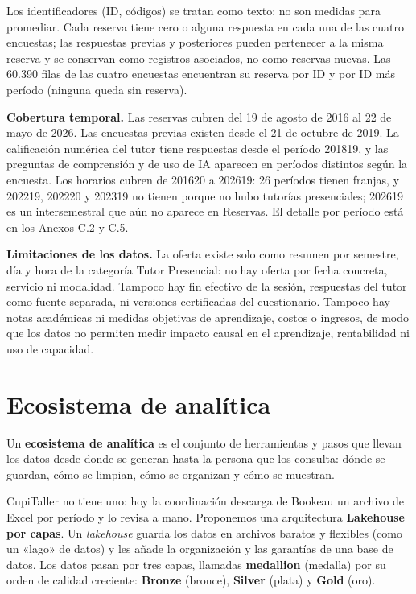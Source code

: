 \documentclass[11pt,letterpaper]{article}
\begin{document}
Los identificadores (ID, códigos) se tratan como texto: no son medidas para promediar. Cada reserva tiene cero o alguna respuesta en cada una de las cuatro encuestas; las respuestas previas y posteriores pueden pertenecer a la misma reserva y se conservan como registros asociados, no como reservas nuevas. Las 60.390 filas de las cuatro encuestas encuentran su reserva por ID y por ID más período (ninguna queda sin reserva).

\textbf{Cobertura temporal.} Las reservas cubren del 19 de agosto de 2016 al 22 de mayo de 2026. Las encuestas previas existen desde el 21 de octubre de 2019. La calificación numérica del tutor tiene respuestas desde el período 201819, y las preguntas de comprensión y de uso de IA aparecen en períodos distintos según la encuesta. Los horarios cubren de 201620 a 202619: 26 períodos tienen franjas, y 202219, 202220 y 202319 no tienen porque no hubo tutorías presenciales; 202619 es un intersemestral que aún no aparece en Reservas. El detalle por período está en los Anexos C.2 y C.5.

\textbf{Limitaciones de los datos.} La oferta existe solo como resumen por semestre, día y hora de la categoría Tutor Presencial: no hay oferta por fecha concreta, servicio ni modalidad. Tampoco hay fin efectivo de la sesión, respuestas del tutor como fuente separada, ni versiones certificadas del cuestionario. Tampoco hay notas académicas ni medidas objetivas de aprendizaje, costos o ingresos, de modo que los datos no permiten medir impacto causal en el aprendizaje, rentabilidad ni uso de capacidad.


\section{Ecosistema de analítica}

Un \textbf{ecosistema de analítica} es el conjunto de herramientas y pasos que llevan los datos desde donde se generan hasta la persona que los consulta: dónde se guardan, cómo se limpian, cómo se organizan y cómo se muestran.

CupiTaller no tiene uno: hoy la coordinación descarga de Bookeau un archivo de Excel por período y lo revisa a mano. Proponemos una arquitectura \textbf{Lakehouse por capas}. Un \emph{lakehouse} guarda los datos en archivos baratos y flexibles (como un «lago» de datos) y les añade la organización y las garantías de una base de datos. Los datos pasan por tres capas, llamadas \textbf{medallion} (medalla) por su orden de calidad creciente: \textbf{Bronze} (bronce), \textbf{Silver} (plata) y \textbf{Gold} (oro).
\end{document}
